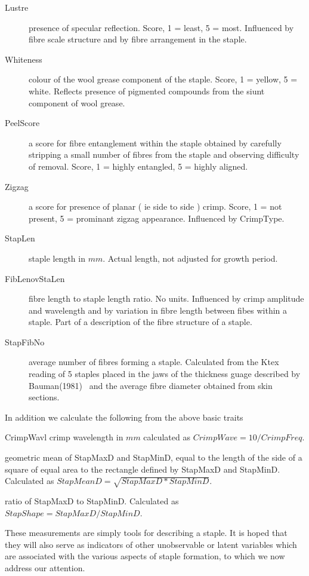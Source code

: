 \documentclass[titlepage]{article}  %
\begin{document}
\begin{description}
\item[Lustre] presence of specular reflection. Score, 1 = least, 5 = most. Influenced by fibre scale structure and by fibre arrangement in the staple.
\item[Whiteness] colour of the wool grease component of the staple. Score, 1 = yellow, 5 = white.  Reflects presence of pigmented compounds from the siunt component of wool grease.
\item[PeelScore] a score for fibre entanglement within the staple obtained by carefully stripping a small number of fibres from the staple and observing difficulty of removal. Score, 1 = highly entangled, 5 = highly aligned. 
\item[Zigzag] a score for presence of planar ( ie side to side ) crimp. Score, 1 = not present, 5 = prominant zigzag appearance. Influenced by CrimpType.
\item[StapLen] staple length in $mm$. Actual length, not adjusted for growth period.
\item[FibLenovStaLen] fibre length to staple length ratio. No units. Influenced by crimp amplitude and wavelength and by variation in fibre length between fibes within a staple. Part of a description of the fibre structure of a staple.
\item[StapFibNo] average number of fibres forming a staple. Calculated from the Ktex reading of 5 staples placed in the jaws of the thickness guage described by Bauman(1981)~\cite{baum:81} and the average fibre diameter obtained from skin sections. 
\end{description}
In addition we calculate the following from the above basic traits
\begin{description}
\item{CrimpWavl} crimp wavelength in $mm$ calculated as $CrimpWave = 10/CrimpFreq$.
\item[StapMeanD] geometric mean of StapMaxD and StapMinD, equal to the length of the side of a square of equal area to the rectangle defined by StapMaxD and StapMinD. Calculated as $StapMeanD = \sqrt{StapMaxD * StapMinD}$.
\item[StapShape] ratio of StapMaxD to StapMinD. Calculated as $StapShape = StapMaxD/StapMinD$.
\end{description}

These measurements are simply tools for describing a staple. It is hoped that they will also serve as indicators of other unobservable or latent variables which are associated with the various aspects of staple formation, to which we now address our attention.
\end{document}
